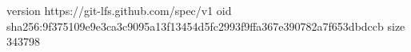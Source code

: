 version https://git-lfs.github.com/spec/v1
oid sha256:9f375109e9e3ca3c9095a13f13454d5fc2993f9ffa367e390782a7f653dbdccb
size 343798
